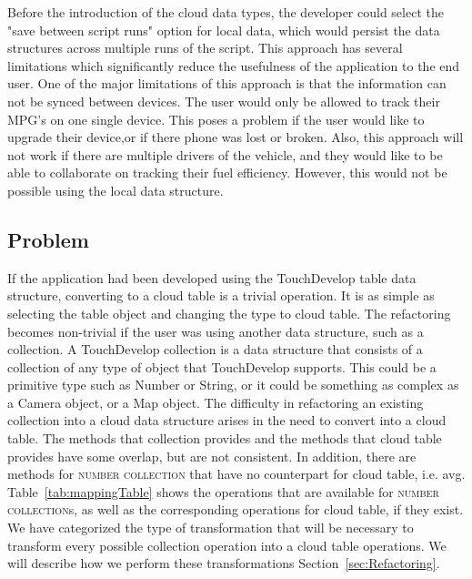\documentclass{sigplanconf}
\begin{document}
Before the introduction of the cloud data types, the developer could select the "save between script runs" option for local data, which would persist the data structures across multiple runs of the script.  This approach has several limitations which significantly reduce the usefulness of the application to the end user.  One of the major limitations of this approach is that the information can not be synced between devices.  The user would only be allowed to track their MPG's on one single device.  This poses a problem if the user would like to upgrade their device,or if there phone was lost or broken.   Also, this approach will not work if there are multiple drivers of the vehicle, and they would like to be able to collaborate on tracking their fuel efficiency.  However, this would not be possible using the local data structure.


  
\subsection{Problem}
If the application had been developed using the TouchDevelop table data structure, converting to a cloud table is a trivial operation.  It is as simple as selecting the table object and changing the type to cloud table.  The refactoring becomes non-trivial if the user was using another data structure, such as a collection. A TouchDevelop collection is a data structure that consists of a collection of any type of object that TouchDevelop supports.  This could be a primitive type such as Number or String, or it could be something as complex as a Camera object, or a Map object.  The difficulty in refactoring an existing collection into a cloud data structure arises in the need to convert into a cloud table.  The methods that collection provides and the methods that cloud table provides have some overlap, but are not consistent.  In addition, there are methods for \textsc{number collection} that have no counterpart for cloud table, i.e. avg.  Table~\ref{tab:mappingTable} shows the operations that are available for \textsc{number collection}s, as well as the corresponding operations for cloud table, if they exist.  We have categorized the type of transformation that will be necessary to transform every possible collection operation into a cloud table operations.  We will describe how we perform these transformations Section~\ref{sec:Refactoring}.
\end{document}
